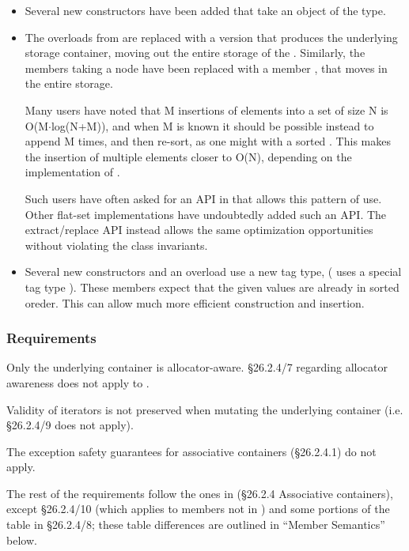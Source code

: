 \begin{itemize}
  \item Several new constructors have been added that take an object of the
     type.

  \item The  overloads from  are replaced with a
    version that produces the underlying storage container, moving out the
    entire storage of the .  Similarly, the 
    members taking a node have been replaced with a member , that moves in the entire storage.

    Many users have noted that M insertions of elements into a set of size N
    is O(M$\cdot$log(N+M)), and when M is known it should be possible instead
    to append M times, and then re-sort, as one might with a sorted
    .  This makes the insertion of multiple elements closer to
    O(N), depending on the implementation of .

    Such users have often asked for an API in
     that allows this pattern of use.  Other
    flat-set implementations have undoubtedly added such an API.  The
    extract/replace API instead allows the same optimization opportunities
    without violating the class invariants.

  \item Several new constructors and an  overload use a new tag
    type,  ( uses a special tag type
    ).  These members expect that the given values are already
    in sorted oreder.  This can allow much more efficient construction and
    insertion.
\end{itemize}

\subsubsection{ Requirements}

Only the underlying container is allocator-aware.  \S26.2.4/7 regarding
allocator awareness does not apply to .

Validity of iterators is not preserved when mutating the underlying container
(i.e. \S26.2.4/9 does not apply).

The exception safety guarantees for associative containers (\S26.2.4.1) do not
apply.

The rest of the requirements follow the ones in (\S26.2.4 Associative
containers), except \S26.2.4/10 (which applies to members not in
) and some portions of the table in \S26.2.4/8; these table
differences are outlined in ``Member Semantics'' below.

